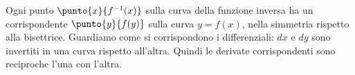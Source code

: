 \begin{inaccessibleblock}
 \begin{center}
 \begin{minipage}[]{.55\textwidth}
  \diffinversa
 \end{minipage} 
  \hfill
 \begin{minipage}[]{.42\textwidth}
Ogni punto $\punto{x}{f^{-1}(x)}$ sulla curva della funzione inversa ha un
corrispondente $\punto{y}{f(y)}$ sulla curva $y=f(x)$, nella simmetria rispetto
alla bisettrice. Guardiamo come si corrispondono i differenziali:
$dx$ e $dy$ sono invertiti in una curva rispetto all'altra. Quindi le 
derivate corrispondenti sono reciproche l'una con l'altra.
 \end{minipage}
 \end{center}
\end{inaccessibleblock}
\label{}

